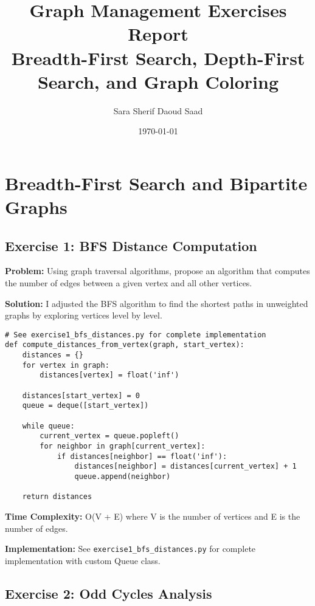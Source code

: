 \documentclass[12pt,a4paper]{article}
\title{\textbf{Graph Management Exercises Report}\\
\large Breadth-First Search, Depth-First Search, and Graph Coloring}
\author{Sara Sherif Daoud Saad}
\date{\today}
\begin{document}
\maketitle

\tableofcontents
\newpage



\section{Breadth-First Search and Bipartite Graphs}

\subsection{Exercise 1: BFS Distance Computation}

\textbf{Problem:} Using graph traversal algorithms, propose an algorithm that computes the number of edges between a given vertex and all other vertices. 

\textbf{Solution:}  I adjusted the BFS algorithm to find the shortest paths in unweighted graphs by exploring vertices level by level.

\begin{lstlisting}[caption=BFS Distance Computation, label=lst:bfs_distances]
# See exercise1_bfs_distances.py for complete implementation
def compute_distances_from_vertex(graph, start_vertex):
    distances = {}
    for vertex in graph:
        distances[vertex] = float('inf')
    
    distances[start_vertex] = 0
    queue = deque([start_vertex])
    
    while queue:
        current_vertex = queue.popleft()
        for neighbor in graph[current_vertex]:
            if distances[neighbor] == float('inf'):
                distances[neighbor] = distances[current_vertex] + 1
                queue.append(neighbor)
    
    return distances
\end{lstlisting}

\textbf{Time Complexity:} O(V + E) where V is the number of vertices and E is the number of edges.


\textbf{Implementation:} See \texttt{exercise1\_bfs\_distances.py} for complete implementation with custom Queue class.

\subsection{Exercise 2: Odd Cycles Analysis}
\end{document}

